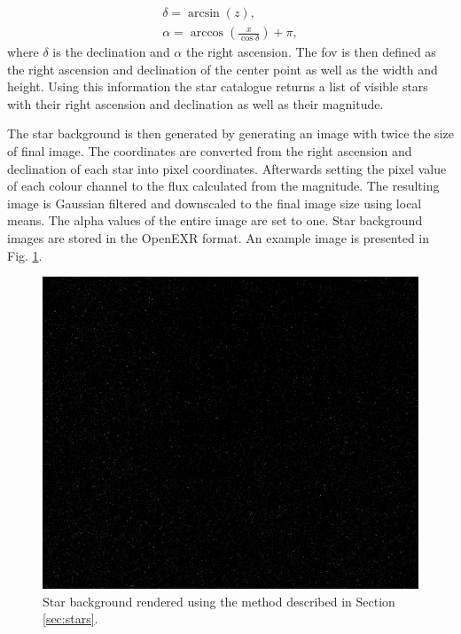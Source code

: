 \begin{align}
    \delta = \arcsin{(z)}, \label{eq:declination} \\
    \alpha = \arccos{\left(\frac{x}{\cos{\delta}}\right)} + \pi, \label{eq:right_ascension}
\end{align}
where $\delta$ is the declination and $\alpha$ the right ascension. The \gls{fov} is then defined as the right ascension and declination of the center point as well as the width and height. Using this information the star catalogue returns a list of visible stars with their right ascension and declination as well as their magnitude.

The star background is then generated by generating an image with twice the size of final image. The coordinates are converted from the right ascension and declination of each star into pixel coordinates. Afterwards setting the pixel value of each colour channel to the flux calculated from the magnitude. The resulting image is Gaussian filtered and downscaled to the final image size using local means. The alpha values of the entire image are set to one. Star background images are stored in the OpenEXR format. An example image is presented in Fig. \ref{fig:star_rendering}.

\begin{figure}[htpb]
    \centering
    \includegraphics[width=\textwidth]{doc/thesis/0_figures/star_rendering/Stars_2017-08-15T115856-171000.png}
    \caption{Star background rendered using the method described in Section \ref{sec:stars}.}
    \label{fig:star_rendering}
\end{figure}



